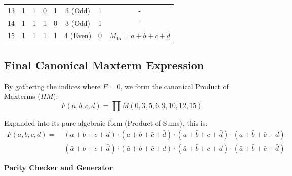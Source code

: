 \documentclass[12pt,a3paper]{article}
\newcommand{\subtopic}[2]{%
  \vspace{10pt}
  \noindent\begin{tcolorbox}[colback=#1!8,colframe=#1,boxrule=0.6pt,arc=4pt,
    left=6pt,right=6pt,top=4pt,bottom=4pt]
    \small\bfseries\textcolor{#1}{#2}
  \end{tcolorbox}
  \vspace{2pt}
}
\begin{document}
\begin{enumerate}
\begin{tcolorbox}[enhanced,breakable,ansbox,colback=cA!4,colframe=cA,boxrule=0.8pt,arc=5pt,title={\textbf{Answer}},fonttitle=\bfseries\color{white},colbacktitle=cA]
\begin{center}
\begin{tabular}{ccccc|c|c|c}
    13 & 1 & 1 & 0 & 1 & 3 (Odd)  & 1 & - \\
    14 & 1 & 1 & 1 & 0 & 3 (Odd)  & 1 & - \\
    \textcolor{cA}{15} & \textcolor{cA}{1} & \textcolor{cA}{1} & \textcolor{cA}{1} & \textcolor{cA}{1} & \textcolor{cA}{4 (Even)} & \textcolor{cA}{0} & \textcolor{cA}{$M_{15} = \bar{a} + \bar{b} + \bar{c} + \bar{d}$} \\
    \bottomrule
\end{tabular}
\end{center}

\subsection*{Final Canonical Maxterm Expression}

By gathering the indices where $F=0$, we form the canonical Product of Maxterms ($\Pi M$):
\begin{equation}
    F(a, b, c, d) = \prod M(0, 3, 5, 6, 9, 10, 12, 15)
\end{equation}

Expanded into its pure algebraic form (Product of Sums), this is:
\begin{align*}
    F(a, b, c, d) = \;& (a + b + c + d) \cdot (a + b + \bar{c} + \bar{d}) \cdot (a + \bar{b} + c + \bar{d}) \cdot (a + \bar{b} + \bar{c} + d) \cdot \\
    & (\bar{a} + b + c + \bar{d}) \cdot (\bar{a} + b + \bar{c} + d) \cdot (\bar{a} + \bar{b} + c + d) \cdot (\bar{a} + \bar{b} + \bar{c} + \bar{d})
\end{align*}

\end{tcolorbox}

\end{enumerate}

\subtopic{cA}{Parity Checker and Generator}
\label{sub:s1-parity}
\end{document}
